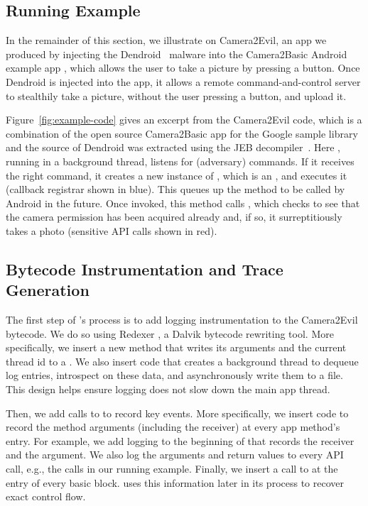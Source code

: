 \subsection{Running Example}

In the remainder of this section, we illustrate \hogarth{} on
\textsf{Camera2Evil}, an app we produced by injecting the
Dendroid~\cite{dendroid} malware into the \textsf{Camera2Basic} Android example
app \cite{camera2basic}, which allows the user to take a picture by
pressing a button. Once Dendroid is injected into the app, it allows a remote command-and-control
server to stealthily take a picture, without the user pressing a
button, and upload it.

Figure~\ref{fig:example-code} gives an excerpt from the
\textsf{Camera2Evil} code, which is a combination of the open source
\textsf{Camera2Basic} app for the Google sample library and 
the source of Dendroid was extracted using the JEB decompiler~\cite{jeb}. 
 Here , running in a
background thread, listens for (adversary) commands. If it receives
the right command, it creates a new instance of ,
which is an , and executes it (callback registrar shown in blue).
This queues up the   method to be
called by Android in the future. Once invoked, this method
calls , which checks to see that the camera
permission has been acquired already and, if so, it surreptitiously
takes a photo (sensitive API calls shown in red).

\subsection{Bytecode Instrumentation and Trace Generation}

The first step of \hogarth{}'s process is to add logging instrumentation to
the \textsf{Camera2Evil} bytecode.
We do so using Redexer \cite{jsjeon:spsm12}, a Dalvik bytecode rewriting tool.  More
specifically, we insert a new method  that writes
its arguments and the current thread id to a
. We also insert code that
creates a background thread to dequeue log entries, introspect on these data,
and asynchronously write them to a file. This
design helps ensure logging does not slow down the main app thread.

Then, we add calls to  to record key events. More
specifically, we insert code to record the method arguments (including
the receiver) at every app method's entry.
For example, we add logging to the beginning of
 that records the 
receiver and the  argument. We also log the arguments
and return values to every API call, e.g., the  calls in
our running example.  Finally, we insert a call to
 at the entry of every basic block. \hogarth{} uses
this information later in its process to recover exact control flow.

